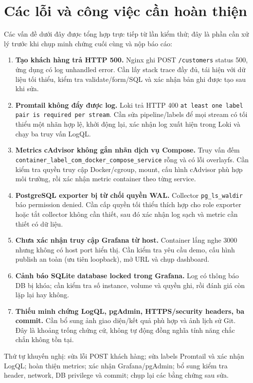 \documentclass[12pt,a4paper]{report}
\begin{document}
\chapter{Các lỗi và công việc cần hoàn thiện}
Các vấn đề dưới đây được tổng hợp trực tiếp từ lần kiểm thử; đây là phần cần xử lý trước khi chụp minh chứng cuối cùng và nộp báo cáo:
\begin{enumerate}
\item \textbf{Tạo khách hàng trả HTTP 500.} Nginx ghi POST \texttt{/customers} status 500, ứng dụng có log unhandled error. Cần lấy stack trace đầy đủ, tái hiện với dữ liệu tối thiểu, kiểm tra validate/form/SQL và xác nhận bản ghi được tạo sau khi sửa.
\item \textbf{Promtail không đẩy được log.} Loki trả HTTP 400 \texttt{at least one label pair is required per stream}. Cần sửa pipeline/labels để mọi stream có tối thiểu một nhãn hợp lệ, khởi động lại, xác nhận log xuất hiện trong Loki và chạy ba truy vấn LogQL.
\item \textbf{Metrics cAdvisor không gắn nhãn dịch vụ Compose.} Truy vấn đếm \texttt{container\_label\_com\_docker\_compose\_service} rỗng và có lỗi overlayfs. Cần kiểm tra quyền truy cập Docker/cgroup, mount, cấu hình cAdvisor phù hợp môi trường, rồi xác nhận metric container theo từng service.
\item \textbf{PostgreSQL exporter bị từ chối quyền WAL.} Collector \texttt{pg\_ls\_waldir} báo permission denied. Cần cấp quyền tối thiểu thích hợp cho role exporter hoặc tắt collector không cần thiết, sau đó xác nhận log sạch và metric cần thiết có dữ liệu.
\item \textbf{Chưa xác nhận truy cập Grafana từ host.} Container lắng nghe 3000 nhưng không có host port hiển thị. Cần kiểm tra yêu cầu demo, cấu hình publish an toàn (ưu tiên loopback), mở URL và chụp dashboard.
\item \textbf{Cảnh báo SQLite database locked trong Grafana.} Log có thông báo DB bị khóa; cần kiểm tra số instance, volume và quyền ghi, rồi đánh giá còn lặp lại hay không.
\item \textbf{Thiếu minh chứng LogQL, pgAdmin, HTTPS/security headers, ba commit.} Cần bổ sung ảnh giao diện/kết quả phù hợp và ảnh lịch sử Git. Đây là khoảng trống chứng cứ, không tự động đồng nghĩa tính năng chắc chắn không tồn tại.
\end{enumerate}
Thứ tự khuyến nghị: sửa lỗi POST khách hàng; sửa labels Promtail và xác nhận LogQL; hoàn thiện metrics; xác nhận Grafana/pgAdmin; bổ sung kiểm tra header, network, DB privilege và commit; chụp lại các bằng chứng sau sửa.
\end{document}
